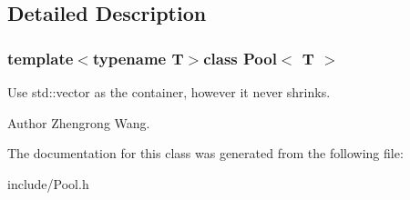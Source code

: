 \subsection{Detailed Description}
\subsubsection*{template$<$typename T$>$class Pool$<$ T $>$}

Use std\+::vector as the container, however it never shrinks. \begin{DoxyAuthor}{Author}
Zhengrong Wang. 
\end{DoxyAuthor}


The documentation for this class was generated from the following file\+:\begin{DoxyCompactItemize}
\item 
include/Pool.\+h\end{DoxyCompactItemize}
